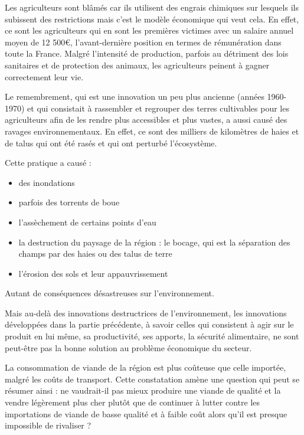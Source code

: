 \documentclass[a4paper,12pt]{report}
\begin{document}
			Les agriculteurs sont blâmés car ils utilisent des engrais chimiques sur lesquels ils subissent des restrictions mais c’est le modèle économique qui veut cela. En effet, ce sont les agriculteurs qui en sont les premières victimes avec un salaire annuel moyen de 12 500\euro, l’avant-dernière position en termes de rémunération dans toute la France\cite{AlguesVertesNouvellePreuveRavagesProductivismeAgricole}. Malgré l’intensité de production, parfois au détriment des lois sanitaires et de protection des animaux, les agriculteurs peinent à gagner correctement leur vie.
			
			
			Le remembrement, qui est une innovation un peu plus ancienne (années 1960-1970) et qui consistait à rassembler et regrouper des terres cultivables pour les agriculteurs afin de les rendre plus accessibles et plus vastes, a aussi causé des ravages environnementaux. En effet, ce sont des milliers de kilomètres de haies et de talus qui ont été rasés et qui ont perturbé l’écosystème.
			
			Cette pratique a causé :
			\begin{itemize}
				\item des inondations
				\item parfois des torrents de boue
				\item l’assèchement de certains points d’eau
				\item la destruction du paysage de la région : le bocage, qui est la séparation des champs par des haies ou des talus de terre
				\item l’érosion des sols et leur appauvrissement
			\end{itemize}
			
			Autant de conséquences désastreuses sur l’environnement.	
			
			Mais au-delà des innovations destructrices de l’environnement, les innovations développées dans la partie précédente, à savoir celles qui consistent à agir sur le produit en lui même, sa productivité, ses apports, la sécurité alimentaire, ne sont peut-être pas la bonne solution au problème économique du secteur.
			
			La consommation de viande de la région est plus coûteuse que celle importée, malgré les coûts de transport. Cette constatation amène une question qui peut se résumer ainsi : ne vaudrait-il pas mieux produire une viande de qualité et la vendre légèrement plus cher plutôt que de continuer à lutter contre les importations de viande de basse qualité et à faible coût alors qu’il est presque impossible de rivaliser ?
			
\end{document}
